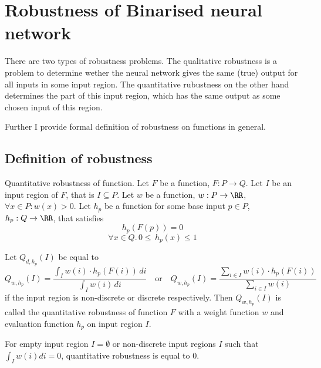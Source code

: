 \section{Robustness of Binarised neural network}

There are two types of robustness problems. The qualitative robustness
is a problem to determine wether the neural network gives the same (true)
output for all inputs in some input region. The quantitative rubustness
on the other hand determines the part of this input region, which has
the same output as some chosen input of this region.

Further I provide formal definition of robustness on functions in general.

\subsection{Definition of robustness}

\begin{definition}{Quantitative robustness of function.}
    Let $F$ be a function, $F: P \to Q$.
    Let $I$ be an input region of $F$, that is $I \subseteq P$.
    Let $w$ be a function, $w: P\to \RR$, $\forall x\in P: w(x) > 0$.
    Let $h_p$ be a function for some base input $p\in P$, $h_p: Q\to \RR$, that satisfies
    \begin{equation*}
        h_p(F(p)) = 0
    \end{equation*}
    \begin{equation*}
        \forall x\in Q .\, 0 \leq \, h_p(x) \leq 1 
    \end{equation*}

    \noindent
    Let $Q_{d, h_p}(I)$ be equal to
    \begin{equation*}
        Q_{w, h_p}(I) = \frac{\int_I w(i)\cdot h_p(F(i)) \, di}{\int_I w(i) \, di}
        \hspace{1em} \text{or} \hspace{1em}
        Q_{w, h_p}(I) = \frac{\sum_{i\in I} w(i)\cdot h_p(F(i))}{\sum_{i\in I} w(i)}
    \end{equation*}
    if the input region is non-discrete or discrete respectively.
    Then $Q_{w, h_p}(I)$ is called the quantitative robustness of function $F$
    with a weight function $w$ and evaluation function $h_p$ on input region $I$.

    For empty input region $I = \emptyset$
    or non-discrete input regions $I$ such that $\int_I w(i) di = 0$,
    quantitative robustness is equal to $0$.
\end{definition}

